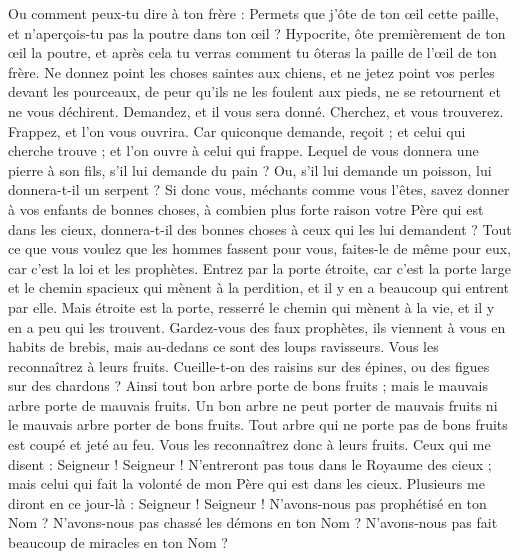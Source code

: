 \begin{multicols}{2}
Ou comment peux-tu dire à ton frère : Permets que j'ôte de ton œil cette paille, et n’aperçois-tu pas la poutre dans ton œil ?
Hypocrite, ôte premièrement de ton œil la poutre, et après cela tu verras comment tu ôteras la paille de l’œil de ton frère.
Ne donnez point les choses saintes aux chiens, et ne jetez point vos perles devant les pourceaux, de peur qu'ils ne les foulent aux pieds, ne se retournent et ne vous déchirent.
Demandez, et il vous sera donné. Cherchez, et vous trouverez. Frappez, et l’on vous ouvrira.
Car quiconque demande, reçoit ; et celui qui cherche trouve ; et l’on ouvre à celui qui frappe.
Lequel de vous donnera une pierre à son fils, s'il lui demande du pain ?
Ou, s’il lui demande un poisson, lui donnera-t-il un serpent ?
Si donc vous, méchants comme vous l’êtes, savez donner à vos enfants de bonnes choses, à combien plus forte raison votre Père qui est dans les cieux, donnera-t-il des bonnes choses à ceux qui les lui demandent ?
Tout ce que vous voulez que les hommes fassent pour vous, faites-le de même pour eux, car c’est la loi et les prophètes.
Entrez par la porte étroite, car c’est la porte large et le chemin spacieux qui mènent à la perdition, et il y en a beaucoup qui entrent par elle.
Mais étroite est la porte, resserré le chemin qui mènent à la vie, et il y en a peu qui les trouvent.
Gardez-vous des faux prophètes, ils viennent à vous en habits de brebis, mais au-dedans ce sont des loups ravisseurs.
Vous les reconnaîtrez à leurs fruits. Cueille-t-on des raisins sur des épines, ou des figues sur des chardons ?
Ainsi tout bon arbre porte de bons fruits ; mais le mauvais arbre porte de mauvais fruits.
Un bon arbre ne peut porter de mauvais fruits ni le mauvais arbre porter de bons fruits.
Tout arbre qui ne porte pas de bons fruits est coupé et jeté au feu.
Vous les reconnaîtrez donc à leurs fruits.
Ceux qui me disent : Seigneur ! Seigneur ! N’entreront pas tous dans le Royaume des cieux ; mais celui qui fait la volonté de mon Père qui est dans les cieux.
Plusieurs me diront en ce jour-là : Seigneur ! Seigneur ! N’avons-nous pas prophétisé en ton Nom ? N'avons-nous pas chassé les démons en ton Nom ? N'avons-nous pas fait beaucoup de miracles en ton Nom ?

\end{multicols}

